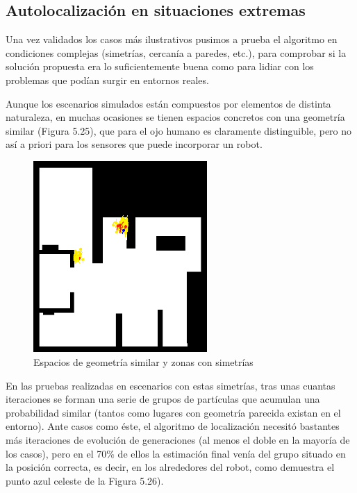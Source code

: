 \subsection{Autolocalización en situaciones extremas}
Una vez validados los casos más ilustrativos pusimos a prueba el algoritmo en condiciones complejas (simetrías, cercanía a paredes, etc.), para comprobar si la solución propuesta era lo suficientemente buena como para lidiar con los problemas que podían surgir en entornos reales.

Aunque los escenarios simulados están compuestos por elementos de distinta naturaleza, en muchas ocasiones se tienen espacios concretos con una geometría similar (Figura 5.25), que para el ojo humano es claramente distinguible, pero no así a priori para los sensores que puede incorporar un robot.


\begin{figure}[H]
	\begin{center}
		\includegraphics[width=0.59\textwidth, ]{figures/similar.png}
		\caption{Espacios de geometría similar y zonas con simetrías}
		\label{fig.similar}
		\end{center}
\end{figure}
En las pruebas realizadas en escenarios con estas simetrías, tras unas cuantas iteraciones se forman una serie de grupos de partículas que acumulan una probabilidad similar (tantos como lugares con geometría parecida existan en el entorno). Ante casos como éste, el algoritmo de localización necesitó bastantes más iteraciones de evolución de generaciones (al menos el doble en la mayoría de los casos), pero en el 70\% de ellos la estimación final venía del grupo situado en la posición correcta, es decir, en los alrededores del robot, como demuestra el punto azul celeste de la Figura 5.26).

